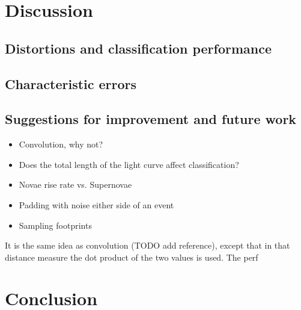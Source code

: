 \documentclass[10pt]{article}
\begin{document}
	\section{Discussion}
	\subsection{Distortions and classification performance}
	\subsection{Characteristic errors}
	\subsection{Suggestions for improvement and future work}
		\begin{itemize}
			\item Convolution, why not?
			\item Does the total length of the light curve affect classification?
			\item Novae rise rate vs. Supernovae
			\item Padding with noise either side of an event	 
			\item Sampling footprints
		\end{itemize}
	 It is the same idea as convolution (TODO add reference), except that in that distance measure the dot product of the two values is used. The perf
	
	\section{Conclusion}
	
	
\end{document}
